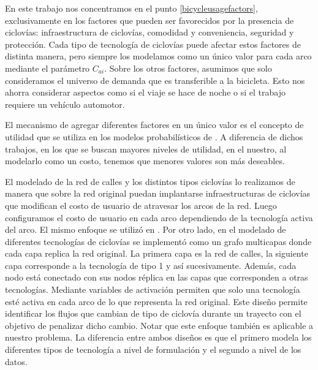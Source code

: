 En este trabajo nos concentramos en el punto \ref{bicycleusagefactors}, exclusivamente en los factores que pueden ser favorecidos por la presencia de ciclovías: infraestructura de ciclovías, comodidad y conveniencia, seguridad y protección. Cada tipo de tecnología de ciclovías puede afectar estos factores de distinta manera, pero siempre los modelamos como un único valor para cada arco mediante el parámetro $C_{ai}$. Sobre los otros factores, asumimos que solo consideramos el universo de demanda que es transferible a la bicicleta. Esto nos ahorra considerar aspectos como si el viaje se hace de noche o si el trabajo requiere un vehículo automotor.

El mecanismo de agregar diferentes factores en un único valor es el concepto de utilidad que se utiliza en los modelos probabilísticos de \textcite{ortuz2011, Pacheco2021}. A diferencia de dichos trabajos, en los que se buscan mayores niveles de utilidad, en el nuestro, al modelarlo como un costo, tenemos que menores valores son más deseables.

El modelado de la red de calles y los distintos tipos ciclovías lo realizamos de manera que sobre la red original puedan implantarse infraestructuras de ciclovías que modifican el costo de usuario de atravesar los arcos de la red. Luego configuramos el costo de usuario en cada arco dependiendo de la tecnología activa del arco. El mismo enfoque se utilizó en \parencite{Lin2013, Zhu2019}. Por otro lado, en \parencite{baya2021} el modelado de diferentes tecnologías de ciclovías se implementó como un grafo multicapas donde cada capa replica la red original. La primera capa es la red de calles, la siguiente capa corresponde a la tecnología de tipo 1 y así sucesivamente. Además, cada nodo está conectado con sus nodos réplica en las capas que corresponden a otras tecnologías. Mediante variables de activación permiten que solo una tecnología esté activa en cada arco de lo que representa la red original. Este diseño permite identificar los flujos que cambian de tipo de ciclovía durante un trayecto con el objetivo de penalizar dicho cambio. Notar que este enfoque también es aplicable a nuestro problema. La diferencia entre ambos diseños es que el primero modela los diferentes tipos de tecnología a nivel de formulación y el segundo a nivel de los datos.
